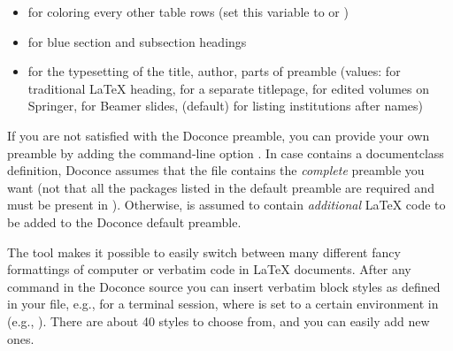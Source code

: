 \documentclass[%
oneside,                 %
final,                   %
10pt]{article}
\begin{document}
\begin{itemize}
 \item {} for coloring every other table rows (set this
   variable to  or )

 \item {} for blue section and subsection headings

 \item {} for the typesetting of the title, author, parts of
   preamble (values:  for traditional {\LaTeX} heading,
    for a separate titlepage,  for
   edited volumes on Springer,  for Beamer slides, 
   (default) for listing institutions after names)
\end{itemize}

\noindent
If you are not satisfied with the Doconce preamble, you can provide
your own preamble by adding the command-line option .
In case  contains a documentclass definition, Doconce assumes
that the file contains the \emph{complete} preamble you want (not that all
the packages listed in the default preamble are required and must be
present in ). Otherwise,  is assumed to contain
\emph{additional} {\LaTeX} code to be added to the Doconce default preamble.

The  tool makes it possible to easily switch between many
different fancy formattings of computer or verbatim code in {\LaTeX}
documents. After any  command in the Doconce source you can
insert verbatim block styles as defined in your 
file, e.g.,  for a terminal session, where  is set to
a certain environment in  (e.g., ).
There are about 40 styles to choose from, and you can easily add
new ones.
\end{document}
